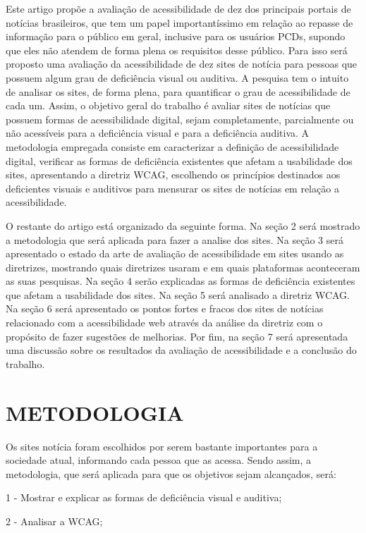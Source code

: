 \documentclass[a4paper]{article}
\begin{document}
\begin{titlepage}
Este artigo propõe a avaliação de acessibilidade de dez dos principais portais de notícias brasileiros, que tem um papel importantíssimo em relação ao repasse de informação para o público em geral, inclusive para os usuários PCDs, supondo que eles não atendem de forma plena os requisitos desse público. Para isso será proposto uma avaliação da acessibilidade de dez sites de notícia para pessoas que possuem algum grau de deficiência visual ou auditiva. A pesquisa tem o intuito de analisar os sites, de forma plena, para quantificar o grau de acessibilidade de cada um. Assim, o objetivo geral do trabalho é avaliar sites de notícias que possuem formas de acessibilidade digital, sejam completamente, parcialmente ou não acessíveis para a deficiência visual e para a deficiência auditiva. A metodologia empregada consiste em caracterizar a definição de acessibilidade digital, verificar as formas de deficiência existentes que afetam a usabilidade dos sites, apresentando a diretriz WCAG, escolhendo os princípios destinados aos deficientes visuais e auditivos para mensurar os sites de notícias em relação a acessibilidade.

O restante do artigo está organizado da seguinte forma. Na seção 2 será mostrado a metodologia que será aplicada para fazer a analise dos sites. Na seção 3 será apresentado o estado da arte de avaliação de acessibilidade em sites usando as diretrizes, mostrando quais diretrizes usaram e em quais plataformas aconteceram as suas pesquisas. Na seção 4 serão explicadas as formas de deficiência existentes que afetam a usabilidade dos sites. Na seção 5 será analisado a diretriz WCAG. Na seção 6 será apresentado os pontos fortes e fracos dos sites de notícias relacionado com a acessibilidade web através da análise da diretriz com o propósito de fazer sugestões de melhorias. Por fim, na seção 7 será apresentada uma discussão sobre os resultados da avaliação de acessibilidade e a conclusão do trabalho.

\section{METODOLOGIA}
Os sites notícia foram escolhidos por serem bastante importantes para a sociedade atual, informando cada pessoa que as acessa. Sendo assim, a metodologia, que será aplicada para que os objetivos sejam alcançados, será:

1 - Mostrar e explicar as formas de deficiência visual e auditiva;

2 - Analisar a WCAG;


\end{titlepage}
\end{document}
